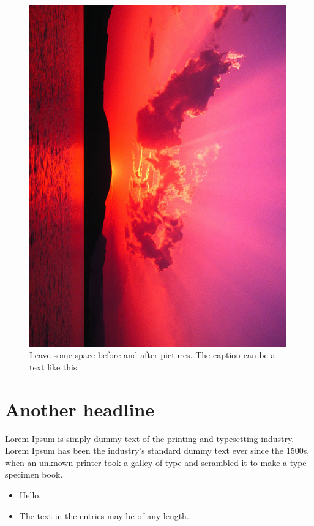\documentclass[final]{beamer}
\begin{document}
\begin{poster}
\begin{figure}
    \includegraphics[width=0.99\textwidth]{flames/pic1.png}
    \caption{\sffamily{} Leave some space before and after pictures. The caption can be a text like this.}
    \label{fig:pic1}
\end{figure}

\newcolumn

\section{Another headline}
\justifying
Lorem Ipsum is simply dummy text of the printing and typesetting industry. Lorem Ipsum has been the industry's standard dummy text ever since the 1500s, when an unknown printer took a galley of type and scrambled it to make a type specimen book. 

\begin{itemize}
  \item Hello.
  \item The text in the entries may be of any length.
\end{itemize}


\end{poster}
\end{document}
